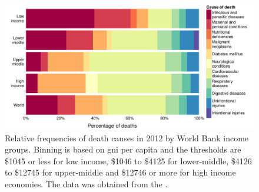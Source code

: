 \begin{knitrout}
\color{fgcolor}\begin{figure}
\includegraphics[width=\maxwidth]{figures/R/who-deaths/topCauses-who-deaths_top-causes-1} \caption[Relative frequencies of death causes in 2012 by World Bank income groups.]{Relative frequencies of death causes in 2012 by World Bank income groups. Binning is based on \acrfull{gni} per capita and the thresholds are \$1045 or less for low income, \$1046 to \$4125 for lower-middle, \$4126 to \$12745 for upper-middle and \$12746 or more for high income economies. The data was obtained from the \citet{WHO2012}.}\label{fig:who-deaths_top-causes}
\end{figure}


\end{knitrout}

\newcommand{\knitrTotalDeathsTwelve}{58.3 million}

\newcommand{\knitrPercentageDeathsTwelveHigh}{20.1\%}
\newcommand{\knitrPercentageDeathsTwelveLow}{14\%}
\newcommand{\knitrPercentageDeathsTwelveLmid}{36.5\%}
\newcommand{\knitrPercentageDeathsTwelveUmid}{29.4\%}

\newcommand{\knitrPercentDeathsTwelveLowInfect}{39.6\%}
\newcommand{\knitrPercentDeathsTwelveLowPerinat}{20.8\%}
\newcommand{\knitrPercentDeathsTwelveLmidInfect}{23.3\%}
\newcommand{\knitrPercentDeathsTwelveLmidCardio}{26.5\%}
\newcommand{\knitrPercentDeathsTwelveUmidInfect}{8.5\%}
\newcommand{\knitrPercentDeathsTwelveHighInfect}{6.7\%}
\newcommand{\knitrPercentDeathsTwelveWorldInfect}{18.3\%}
\newcommand{\knitrPercentDeathsTwelveWorldCardio}{33.7\%}
\newcommand{\knitrPercentDeathsTwelveWorldCancer}{15.8\%}
